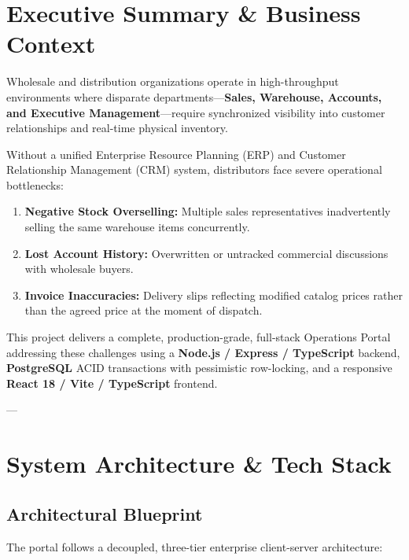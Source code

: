 \documentclass[11pt,a4paper]{article}
\begin{document}
\newpage
\tableofcontents
\newpage

\section{Executive Summary \& Business Context}
Wholesale and distribution organizations operate in high-throughput environments where disparate departments—\textbf{Sales, Warehouse, Accounts, and Executive Management}—require synchronized visibility into customer relationships and real-time physical inventory.

Without a unified Enterprise Resource Planning (ERP) and Customer Relationship Management (CRM) system, distributors face severe operational bottlenecks:
\begin{enumerate}[itemsep=0.2em]
    \item \textbf{Negative Stock Overselling:} Multiple sales representatives inadvertently selling the same warehouse items concurrently.
    \item \textbf{Lost Account History:} Overwritten or untracked commercial discussions with wholesale buyers.
    \item \textbf{Invoice Inaccuracies:} Delivery slips reflecting modified catalog prices rather than the agreed price at the moment of dispatch.
\end{enumerate}

This project delivers a complete, production-grade, full-stack Operations Portal addressing these challenges using a \textbf{Node.js / Express / TypeScript} backend, \textbf{PostgreSQL} ACID transactions with pessimistic row-locking, and a responsive \textbf{React 18 / Vite / TypeScript} frontend.

---

\section{System Architecture \& Tech Stack}

\subsection{Architectural Blueprint}
The portal follows a decoupled, three-tier enterprise client-server architecture:
\end{document}
